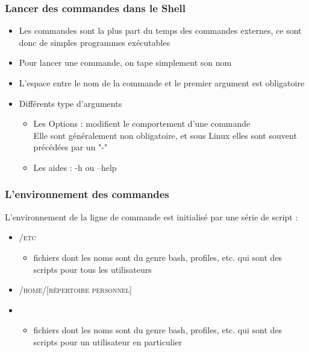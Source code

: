 \documentclass[a4paper]{article}
\begin{document}
    \subsubsection{Lancer des commandes dans le Shell}
    \begin{itemize}[label=\textbullet, font=\Large]
      \item Les commandes sont la plus part du temps des commandes externes, ce sont donc de simples programmes exécutables
      \item Pour lancer une commande, on tape simplement son nom
      \item L'espace entre le nom de la commande et le premier argument est obligatoire
      \item Différents type d'arguments
      \begin{itemize}[label=, font=\scriptsize]
        \item Les Options : modifient le comportement d'une commande\\ Elle sont généralement non obligatoire, et sous Linux elles sont souvent précédées par un "-"
        \item Les aides : -h ou --help
      \end{itemize}
    \end{itemize}

    \subsubsection{L'environnement des commandes}
    L'environnement de la ligne de commande est initialisé par une série de script :
    \begin{itemize}[label=\textbullet, font=\Large]
      \item \textsc{/etc}
      \begin{itemize}[label=, font=\scriptsize]
        \item fichiers dont les noms sont du genre bash, profiles, etc. qui sont des scripts pour tous les utilisateurs
      \end{itemize}
      \item \textsc{/home/[répertoire personnel]}
      \item \begin{itemize}[label=, font=\scriptsize]
        \item fichiers dont les noms sont du genre bash, profiles, etc. qui sont des scripts pour un utilisateur en particulier
      \end{itemize}
    \end{itemize}
\end{document}

